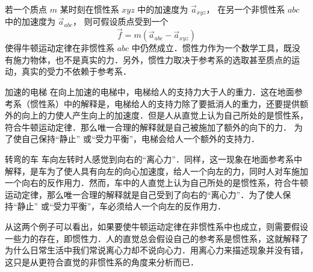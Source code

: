 

若一个质点 $m$ 某时刻在惯性系 $xyz$ 中的加速度为 $\vec a_{xyz}$， 在另一个非惯性系 $abc$ 中的加速度为 $\vec a_{abc}$， 则可假设质点受到一个
\begin{equation}\label{Iner_eq1}
\vec f = m( \vec a_{abc} - \vec a_{xyz} )
\end{equation}
使得牛顿运动定律在非惯性系 $abc$ 中仍然成立．惯性力作为一个数学工具，既没有施力物体，也不是真实的力．另外，惯性力取决于参考系的选取甚至质点的运动，真实的受力不依赖于参考系．

\begin{exam}{加速的电梯}\label{Iner_ex1}
在向上加速的电梯中，电梯给人的支持力大于人的重力．这在地面参考系（惯性系）中的解释是，电梯给人的支持力除了要抵消人的重力，还要提供额外的向上的力使人产生向上的加速度．但是人从直觉上认为自己所处的是惯性系，符合牛顿运动定律．那么唯一合理的解释就是自己被施加了额外的向下的力． 为了使自己保持“静止” 或“受力平衡”，电梯会给人一个额外的支持力．
\end{exam}

\begin{exam}{转弯的车}
车向左转时人感觉到向右的“离心力”．同样，这一现象在地面参考系中解释，是车为了使人具有向左的向心加速度，给人一个向左的力，同时人对车施加一个向右的反作用力．然而，车中的人直觉上认为自己所处的是惯性系，符合牛顿运动定律，那么唯一合理的解释就是自己受到了向右的“离心力”．为了使人保持“静止” 或“受力平衡”，车必须给人一个向左的反作用力．
\end{exam}

从这两个例子可以看出，如果要使牛顿运动定律在非惯性系中也成立，则需要假设一些力的存在，即惯性力．人的直觉总会假设自己的参考系是惯性系，这就解释了为什么日常生活中我们常说离心力却不说向心力．用离心力来描述现象并没有错，这只是从更符合直觉的非惯性系的角度来分析而已．

